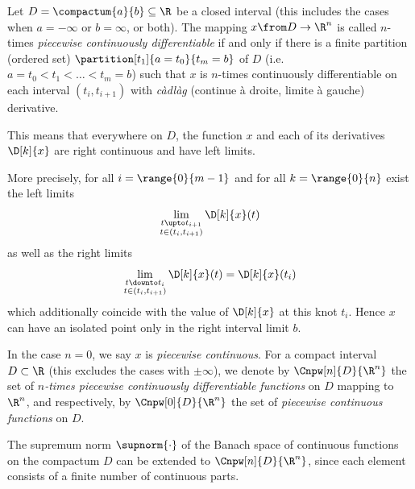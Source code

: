 
    \begin{definition}
    \label{def:pw-cont-diff}
        Let $D=\compactum{a}{b}\subseteq\R$ be a closed interval (this includes the cases when $a=-\infty$ or $b=\infty$, or both). The mapping $x\from D\to\R^n$ is called $n$-times \emph{piecewise continuously differentiable} if and only if there is a finite partition (ordered set) $\partition[t_1]{a=t_0}{t_m=b}$ of $D$ (i.e.\ $a=t_0<t_1<\ldots<t_m=b$) such that $x$ is $n$-times continuously differentiable on each interval $(t_i,t_{i+1})$ with \foreignlanguage{frenchb}{\emph{càdlàg} (\og continue à droite, limite à gauche\fg{})} derivative.

        This means that everywhere on $D$, the function $x$ and each of its derivatives $\D[k]{x}$ are right continuous and have left limits.

        More precisely, for all $i=\range{0}{m-1}$ and for all $k=\range{0}{n}$ exist the left limits
        \begin{equation*}
            \lim_{\substack{t\upto t_{i+1}\\ t\in(t_i,t_{i+1})}} \D[k]{x}(t)
        \end{equation*}
        as well as the right limits
        \begin{equation*}
            \lim_{\substack{t\downto t_{i}\\ t\in(t_i,t_{i+1})}} \D[k]{x}(t) = \D[k]{x}(t_i)
        \end{equation*}
        which additionally coincide with the value of $\D[k]{x}$ at this knot $t_i$.
        Hence $x$ can have an isolated point only in the right interval limit $b$.

        In the case $n=0$, we say $x$ is \emph{piecewise continuous}.
        For a compact interval $D\subset\R$ (this excludes the cases with $\pm\infty$), we denote by $\Cnpw[n]{D}{\R^n}$ the set of \emph{$n$-times piecewise continuously differentiable functions} on $D$ mapping to $\R^n$, and respectively, by $\Cnpw[0]{D}{\R^n}$ the set of \emph{piecewise continuous functions} on $D$.

        The supremum norm $\supnorm{\cdot}$ of the Banach space of continuous functions on the compactum $D$ can be extended to $\Cnpw[n]{D}{\R^n}$, since each element consists of a finite number of continuous parts.
    \end{definition}

